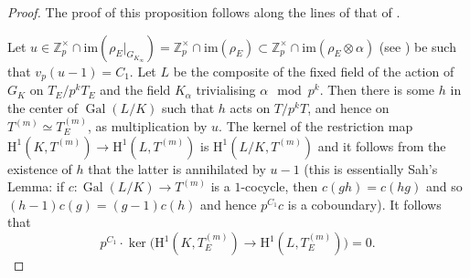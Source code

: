 \documentclass[a4paper,10pt]{amsart}
\numberwithin{equation}{section}
\numberwithin{equation}{section}
\theoremstyle{plain}
\theoremstyle{definition}
\theoremstyle{definition}
\theoremstyle{plain}
\theoremstyle{plain}
\theoremstyle{plain}
\theoremstyle{plain}
\DeclareMathOperator{\ord}{ord}
\newcommand{\Gal}{\operatorname{Gal}}
\newcommand{\Z}{\mathbb{Z}}
\DeclareMathOperator{\Aut}{Aut}
\newcommand{\fm}{\mathfrak{m}}
\newcommand{\rH}{\mathrm{H}}
\begin{document}
\begin{proof}
The proof of this proposition follows along the lines of that of \cite[Prop. 3.3.6]{eisenstein}. 

Let $u\in  \Z_p^\times\cap \mathrm{im}(\rho_E|_{G_{K_\infty}})= \Z_p^\times\cap \mathrm{im}(\rho_E)\subset \Z_p^\times\cap \mathrm{im}(\rho_E \otimes \alpha)$ (see \cite[Lemma 3.3.3]{eisenstein}) be such that $v_p(u-1) = C_1$.   Let $L$ be 
the composite of the fixed field of the action
of $G_K$ on $T_E/p^kT_E$ and the field $K_\alpha$ trivialising $\alpha \mod p^k$.  Then there is some $h$ in the center of $\Gal(L/K)$ 
such that $h$ acts on $T/p^kT$, and hence on $T^{(m)}\simeq T_E^{(m)}$, as multiplication by $u$. The kernel of the 
restriction map $\rH^1(K,T^{(m)})\rightarrow \rH^1(L,T^{(m)})$ is $\rH^1(L/K,T^{(m)})$ and it follows from the existence
of $h$ that the latter is annihilated by $u-1$ (this is essentially Sah's Lemma: if $c:\Gal(L/K)\rightarrow T^{(m)}$ is 
a $1$-cocycle, then $c(gh) = c(hg)$ and so $(h-1)c(g) = (g-1)c(h)$ and hence $p^{C_1}c$ is a coboundary). It follows that 
\begin{equation}\label{eq:kerm}
p^{C_1}\cdot \ker \bigl( \rH^1(K,T_E^{(m)})\to \rH^1(L, T_E^{(m)})\bigr) = 0.
\end{equation}






\end{proof}
\end{document}
